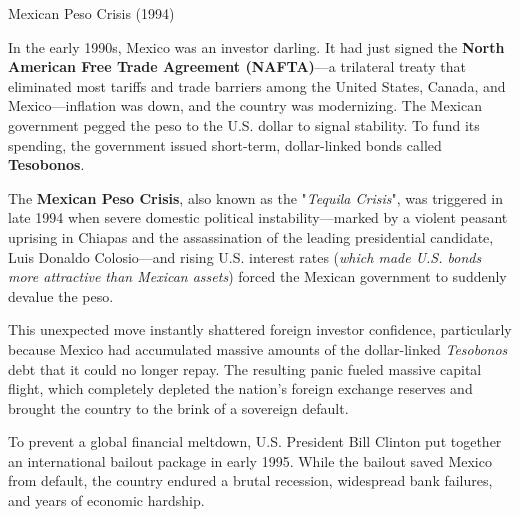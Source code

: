 \documentclass[10pt]{article}
\begin{document}
    \begin{core}[label=core:peso_crisis]{Mexican Peso Crisis (1994)}

      In the early 1990s, Mexico was an investor darling. It had just signed the \textbf{North American Free Trade Agreement (NAFTA)}---a trilateral treaty that eliminated most tariffs and trade barriers among the United States, Canada, and Mexico---inflation was down, and the country was modernizing. The Mexican government pegged the peso to the U.S. dollar to signal stability. To fund its spending, the government issued short-term, dollar-linked bonds called \textbf{Tesobonos}.

      The \textbf{Mexican Peso Crisis}, also known as the "\textit{Tequila Crisis}", was triggered in late 1994 when severe domestic political instability---marked by a violent peasant uprising in Chiapas and the assassination of the leading presidential candidate, Luis Donaldo Colosio---and rising U.S. interest rates (\textit{which made U.S. bonds more attractive than Mexican assets}) forced the Mexican government to suddenly devalue the peso. 

      This unexpected move instantly shattered foreign investor confidence, particularly because Mexico had accumulated massive amounts of the dollar-linked \textit{Tesobonos} debt that it could no longer repay. The resulting panic fueled massive capital flight, which completely depleted the nation's foreign exchange reserves and brought the country to the brink of a sovereign default. 


      To prevent a global financial meltdown, U.S. President Bill Clinton put together an international bailout package in early 1995. While the bailout saved Mexico from default, the country endured a brutal recession, widespread bank failures, and years of economic hardship.

    \end{core}
\end{document}
